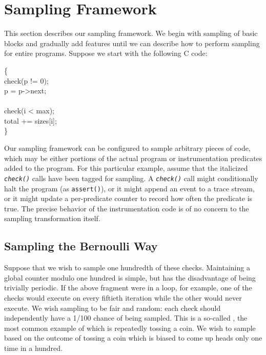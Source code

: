\section{Sampling Framework}
\label{sec:framework}

This section describes our sampling framework.  We begin
with sampling of basic blocks and gradually add features
until we can describe how to perform sampling for entire
programs.  Suppose we start with the following C code:

\begin{code}
  \{\+ \\
  check(p != 0); \\
  \up p = p->next; \\
  \\
  check(i < max); \\
  \up total += sizes[i]; \\
  \<\}
\end{code}

Our sampling framework can be configured to sample arbitrary pieces of
code, which may be either portions of the actual program or
instrumentation predicates added to the program.  For this particular
example, assume that the italicized \texttt{\textit{check()}} calls
have been tagged for sampling.  A \texttt{\textit{check()}} call might
conditionally halt the program (as \texttt{assert()}), or it might
append an event to a trace stream, or it might update a per-predicate
counter to record how often the predicate is true.  The precise
behavior of the instrumentation code is of no concern to the sampling
transformation itself.

\subsection{Sampling the Bernoulli Way}

Suppose that we wish to sample one hundredth of these checks.
Maintaining a global counter modulo one hundred is simple, but has the
disadvantage of being trivially periodic.  If the above fragment were
in a loop, for example, one of the checks would execute on every
fiftieth iteration while the other would never execute.  We wish
sampling to be fair and random: each check should independently have a
1/100 chance of being sampled.  This is a so-called , the most common example of which is repeatedly tossing a
coin.  We wish to sample based on the outcome of tossing a coin which
is biased to come up heads only one time in a hundred.

